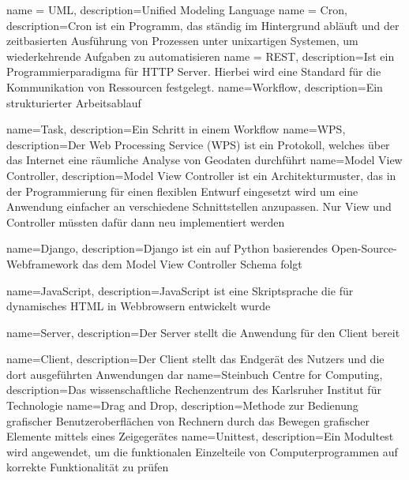 %
%

{ 
    name = UML, 
    description={Unified Modeling Language}
}
{
    name = Cron,
    description={Cron ist ein Programm, das ständig im Hintergrund abläuft und der zeitbasierten Ausführung von Prozessen unter unixartigen Systemen, um wiederkehrende Aufgaben zu automatisieren}
}
{
    name = REST,
    description={Ist ein Programmierparadigma für HTTP Server. Hierbei wird eine Standard für die Kommunikation von Ressourcen festgelegt.}
}
{
    name=Workflow,
    description={Ein strukturierter Arbeitsablauf}
}

{
    name=Task,
    description={Ein Schritt in einem Workflow}
}
{
    name=WPS,
    description={Der Web Processing Service (WPS) ist ein Protokoll, welches über das Internet eine räumliche Analyse von Geodaten durchführt}
}
{
    name=Model View Controller,
    description={Model View Controller ist ein Architekturmuster, das in der Programmierung für einen flexiblen Entwurf eingesetzt wird um eine Anwendung einfacher an verschiedene Schnittstellen anzupassen. Nur View und Controller müssten dafür dann neu implementiert werden}
}

{
    name=Django,
    description={Django ist ein auf Python basierendes Open-Source-Webframework das dem \Gls{Model View Controller} Schema folgt}
}

{
    name=JavaScript,
    description={JavaScript ist eine Skriptsprache die für dynamisches HTML in Webbrowsern entwickelt wurde}
}

{
    name=Server,
    description={Der Server stellt die Anwendung für den Client bereit}
}

{
    name=Client,
    description={Der Client stellt das Endgerät des Nutzers und die dort ausgeführten Anwendungen dar}
}
{
    name=Steinbuch Centre for Computing,
    description={Das wissenschaftliche Rechenzentrum des Karlsruher Institut für Technologie}
}
{
    name=Drag and Drop,
    description={Methode zur Bedienung grafischer Benutzeroberflächen von Rechnern durch das Bewegen grafischer Elemente mittels eines Zeigegerätes}
}
{
    name=Unittest,
    description={Ein Modultest wird angewendet, um die funktionalen Einzelteile von Computerprogrammen auf korrekte Funktionalität zu prüfen}
}